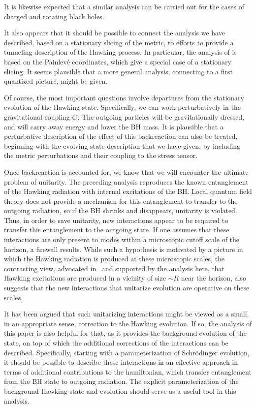 It is likewise expected that a similar analysis can be carried out for the cases of charged and rotating black holes.

It also appears that it should be possible to connect the analysis we have described, based on a stationary slicing of the metric, to efforts to provide a 
tunneling description of the Hawking process.  In particular, the analysis of  is based on the Painlev\'e coordinates, which give a special case of a stationary slicing.  It seems plausible that a more general analysis, connecting to a first quantized picture, might be given.

Of course, the most important questions involve departures from the stationary evolution of the Hawking state.  Specifically, we can work perturbatively in the gravitational coupling $G$.  The outgoing particles will be gravitationally dressed, and will carry away energy and lower the BH mass. It is plausible that a perturbative description of the effect of this backreaction can also be treated, beginning with the evolving state description that we have given, by including the metric perturbations and their coupling to the stress tensor.

Once backreaction is accounted for, we know that we will encounter the ultimate problem of unitarity.  The preceding analysis reproduces the known entanglement of the Hawking radiation with internal excitations of the BH.  Local quantum field theory does not provide a mechanism for this entanglement to transfer to the outgoing radiation, so if the BH shrinks and disappears, unitarity is violated.  Thus, in order to save unitarity, new interactions appear to be required to transfer this entanglement to the outgoing state.  If one assumes that these interactions are only present to modes within a microscopic cutoff scale of the horizon, a firewall results.  While such a hypothesis is motivated by a picture in which the Hawking radiation is produced at these microscopic scales, the contrasting view, advocated in \SGStBo\ and supported by the analysis here, that Hawking excitations are produced in  a vicinity of size $\sim R$ near the horizon, also suggests that the new interactions that unitarize evolution are operative on these scales.

It has been argued that such unitarizing interactions might be viewed as a small, in an appropriate sense, correction to the Hawking evolution.  If so, the analysis of this paper is also helpful for that, as it provides the background evolution of the state, on top of which the additional corrections of the interactions can be described.  Specifically, starting with a parameterization of  Schr\"odinger evolution, it should be possible to describe these interactions in an effective approach in terms of additional contributions to the hamiltonian, which transfer entanglement from the BH state to outgoing radiation.  The explicit parameterization of the background Hawking state and evolution should serve as a useful tool in this analysis.



